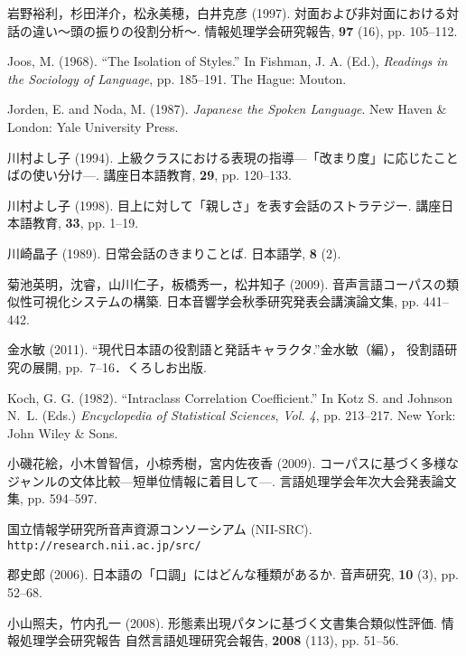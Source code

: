 \documentclass[japanese]{jnlp_1.4}
\begin{document}
\begin{thebibliography}{}
\item
岩野裕利，杉田洋介，松永美穂，白井克彦 (1997). 対面および非対面における対話の違い〜頭の振りの役割分析〜. 情報処理学会研究報告, \textbf{97} (16), pp. 105--112.

\item
Joos, M. (1968). ``The Isolation of Styles.'' In Fishman, J. A. (Ed.), \textit{Readings in the Sociology of Language}, pp. 185--191. The Hague: Mouton.

\item
Jorden, E. and Noda, M. (1987). \textit{Japanese the Spoken Language}. New Haven {\&} London: Yale University Press.

\item
川村よし子 (1994). 上級クラスにおける表現の指導—「改まり度」に応じたことばの使い分け—. 講座日本語教育, \textbf{29}, pp. 120--133.

\item
川村よし子 (1998). 目上に対して「親しさ」を表す会話のストラテジー. 講座日本語教育, \textbf{33}, pp. 1--19.

\item
川崎晶子 (1989). 日常会話のきまりことば. 日本語学, \textbf{8} (2).

\item
菊池英明，沈睿，山川仁子，板橋秀一，松井知子 (2009). 音声言語コーパスの類似性可視化システムの構築. 日本音響学会秋季研究発表会講演論文集, pp. 441--442.
\item
金水敏 (2011). ``現代日本語の役割語と発話キャラクタ.''金水敏（編）， 役割語研究の展開, pp.~7--16．くろしお出版.

\item
Koch, G. G. (1982). ``Intraclass Correlation Coefficient.'' In Kotz S. and Johnson N.~L. (Eds.) \textit{Encyclopedia of Statistical Sciences}, \textit{Vol. 4}, pp. 213--217. New York: John Wiley \& Sons.

\item
小磯花絵，小木曽智信，小椋秀樹，宮内佐夜香 (2009). コーパスに基づく多様なジャンルの文体比較—短単位情報に着目して—. 言語処理学会年次大会発表論文集, pp. 594--597.

\item
国立情報学研究所音声資源コンソーシアム (NII-SRC). \texttt{http://research.nii.ac.jp/src/}

\item
郡史郎 (2006). 日本語の「口調」にはどんな種類があるか. 音声研究, \textbf{10} (3), pp. 52--68.

\item
小山照夫，竹内孔一 (2008). 形態素出現パタンに基づく文書集合類似性評価. 情報処理学会研究報告 自然言語処理研究会報告, \textbf{2008} (113), pp. 51--56.


\end{thebibliography}
\end{document}
